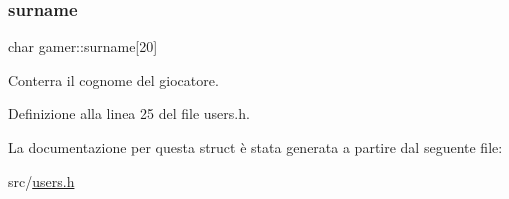 \subsubsection{\texorpdfstring{surname}{surname}}
{\footnotesize\ttfamily char gamer\+::surname\mbox{[}20\mbox{]}}



Conterra\textquotesingle{} il cognome del giocatore. 



Definizione alla linea 25 del file users.\+h.



La documentazione per questa struct è stata generata a partire dal seguente file\+:\begin{DoxyCompactItemize}
\item 
src/\hyperlink{users_8h}{users.\+h}\end{DoxyCompactItemize}

